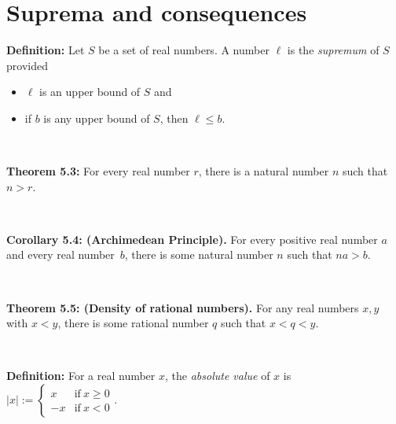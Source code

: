 \documentclass[12pt]{amsart}
\begin{document}
	
	\thispagestyle{empty}
	
	\section*{Suprema and consequences}
	
	

\begin{framed}
\noindent \textbf{Definition:} Let $S$ be a set of real numbers. A number $\ell$ is the \emph{supremum} of $S$ provided
\begin{itemize}
\item $\ell$ is an upper bound of $S$ and 
\item if $b$ is any upper bound of $S$, then $\ell \leq b$.
\end{itemize}

\

\noindent \textbf{Theorem 5.3:} For every real number $r$, there is a natural number $n$ such that $n>r$.

\

\noindent \textbf{Corollary 5.4: (Archimedean Principle).} For every positive real number $a$ and every real number~$b$, there is some natural number $n$ such that $na>b$.

\

\noindent \textbf{Theorem 5.5: (Density of rational numbers).} For any real numbers $x,y$ with $x<y$, there is some rational number $q$ such that $x<q<y$.

\

\noindent \textbf{Definition:} For a real number $x$, the \emph{absolute value} of $x$ is $|x| := \begin{cases} x &\text{if} \ x\geq 0 \\ -x &\text{if} \ x< 0 \end{cases}$.
\end{framed}

\
\end{document}
